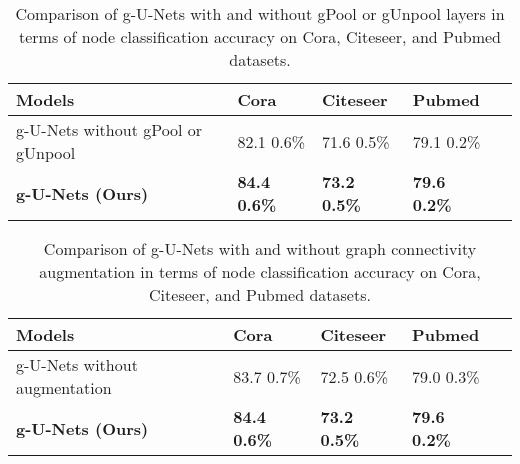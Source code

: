 \documentclass{article}
\begin{document}
\begin{table*}[!th]
\centering \caption{Comparison of g-U-Nets with and without gPool or
gUnpool layers in terms of node classification accuracy on Cora,
Citeseer, and Pubmed datasets.} \label{table:gunet_vs_gunet_no_pool}
\begin{tabularx}{\textwidth}{  lx{3cm}   YYY }
    \hline
    \textbf{Models}       & \textbf{Cora} & \textbf{Citeseer} & \textbf{Pubmed} \\ \hline\hline
    g-U-Nets without gPool or gUnpool        & 82.1  0.6\%   & 71.6  0.5\% & 79.1  0.2\% \\ \hline
    \textbf{g-U-Nets (Ours)}                           & \textbf{84.4  0.6\%}
                                                    & \textbf{73.2  0.5\%}
                                                    & \textbf{79.6  0.2\%} \\ \hline
    \hline
\end{tabularx}
\end{table*}

\begin{table*}[!th]
\centering \caption{Comparison of g-U-Nets with and without graph
connectivity augmentation in terms of node classification accuracy
on Cora, Citeseer, and Pubmed datasets. }
\label{table:gunet_vs_gunet_no_aug}
\begin{tabularx}{\textwidth}{  lx{3.5cm}   YYY }
    \hline
    \textbf{Models}       & \textbf{Cora} & \textbf{Citeseer} & \textbf{Pubmed} \\ \hline\hline
    g-U-Nets without augmentation       & 83.7  0.7\%   & 72.5  0.6\% & 79.0  0.3\% \\ \hline
    \textbf{g-U-Nets (Ours)}                         & \textbf{84.4  0.6\%}
                                                    & \textbf{73.2  0.5\%}
                                                    & \textbf{79.6  0.2\%} \\ \hline
    \hline
\end{tabularx}
\end{table*}
\end{document}
